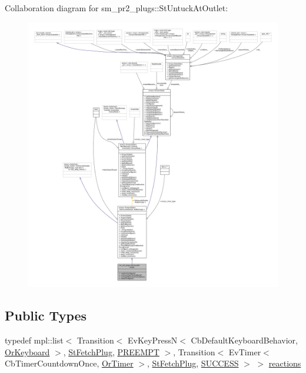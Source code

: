 Collaboration diagram for sm\+\_\+pr2\+\_\+plugs\+:\+:St\+Untuck\+At\+Outlet\+:
\nopagebreak
\begin{figure}[H]
\begin{center}
\leavevmode
\includegraphics[width=350pt]{structsm__pr2__plugs_1_1StUntuckAtOutlet__coll__graph}
\end{center}
\end{figure}
\subsection*{Public Types}
\begin{DoxyCompactItemize}
\item 
typedef mpl\+::list$<$ Transition$<$ Ev\+Key\+PressN$<$ Cb\+Default\+Keyboard\+Behavior, \hyperlink{classsm__pr2__plugs_1_1OrKeyboard}{Or\+Keyboard} $>$, \hyperlink{structsm__pr2__plugs_1_1StFetchPlug}{St\+Fetch\+Plug}, \hyperlink{classPREEMPT}{P\+R\+E\+E\+M\+PT} $>$, Transition$<$ Ev\+Timer$<$ Cb\+Timer\+Countdown\+Once, \hyperlink{classsm__pr2__plugs_1_1OrTimer}{Or\+Timer} $>$, \hyperlink{structsm__pr2__plugs_1_1StFetchPlug}{St\+Fetch\+Plug}, \hyperlink{classSUCCESS}{S\+U\+C\+C\+E\+SS} $>$ $>$ \hyperlink{structsm__pr2__plugs_1_1StUntuckAtOutlet_a77b0bad04ff5db4fc1a9b8557a435211}{reactions}
\end{DoxyCompactItemize}
